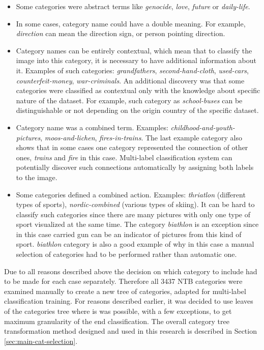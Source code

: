     \begin{itemize}
        \item Some categories were abstract terms like \textit{genocide}, \textit{love}, \textit{future} or \textit{daily-life}.
        \item In some cases, category name could have a double meaning. For example, \textit{direction} can mean the direction sign, or person pointing direction.
        \item Category names can be entirely contextual, which mean that to classify the image into this category, it is necessary to have additional information about it. Examples of such categories: \textit{grandfathers}, \textit{second-hand-cloth}, \textit{used-cars}, \textit{counterfeit-money}, \textit{war-criminals}. An additional discovery was that some categories were classified as contextual only with the knowledge about specific nature of the dataset. For example, such category as \textit{school-buses} can be distinguishable or not depending on the origin country of the specific dataset.
        \item Category name was a combined term. Examples: \textit{childhood-and-youth-pictures}, \textit{moos-and-lichen}, \textit{fires-in-trains}. The last example category also shows that in some cases one category represented the connection of other ones, \textit{trains} and \textit{fire} in this case. Multi-label classification system can potentially discover such connections automatically by assigning both labels to the image.
        \item Some categories defined a combined action. Examples: \textit{thriatlon} (different types of sports), \textit{nordic-combined} (various types of skiing). It can be hard to classify such categories since there are many pictures with only one type of sport visualized at the same time. The category \textit{biathlon} is an exception since in this case carried gun can be an indicator of pictures from this kind of sport. \textit{biathlon} category is also a good example of why in this case a manual selection of categories had to be performed rather than automatic one.
    \end{itemize}
    
    Due to all reasons described above the decision on which category to include had to be made for each case separately. Therefore all 3437 NTB categories were examined manually to create a new tree of categories, adapted for multi-label classification training. For reasons described earlier, it was decided to use leaves of the categories tree where is was possible, with a few exceptions, to get maximum granularity of the end classification. The overall category tree transformation method designed and used in this research is described in Section \ref{sec:main-cat-selection}.
    
